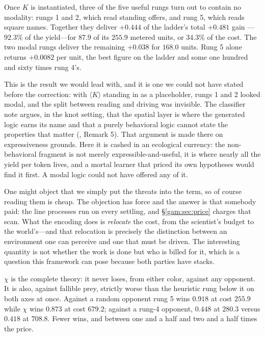 \begin{observation}\label{gam:obs:spatial}
Once $K$ is instantiated, three of the five useful rungs turn out to contain no
modality: rungs 1 and 2, which read standing offers, and rung 5, which reads
square names. Together they deliver $+0.444$ of the ladder's total $+0.481$ gain
---$92.3\%$ of the yield---for $87.9$ of its $255.9$ metered units, or $34.3\%$
of the cost. The two modal rungs deliver the remaining $+0.038$ for $168.0$
units. Rung 5 alone returns $+0.0082$ per unit, the best figure on the ladder
and some one hundred and sixty times rung 4's.
\end{observation}

This is the result we would lead with, and it is one we could not have stated
before the correction: with $\langle K\rangle$ standing in as a placeholder,
rungs 1 and 2 looked modal, and the split between reading and driving was
invisible. The classifier note argues, in the knot setting, that the spatial
layer is where the generated logic earns its name and that a purely behavioral
logic cannot state the properties that matter (\cite{ClassifierNote}, Remark 5).
That argument is made there on expressiveness grounds. Here it is cashed in an
ecological currency: the non-behavioral fragment is not merely
expressible-and-useful, it is where nearly all the yield per token lives, and a
mortal learner that priced its own hypotheses would find it first. A modal logic
could not have offered any of it.

\begin{remark}\label{gam:why-this-artefact-encoding}
One might object that we simply put the threats into the term, so of course
reading them is cheap. The objection has force and the answer is that somebody
paid: the line processes run on every settling, and \S\ref{gam:sec:price} charges
that scan. What the encoding does is \emph{relocate} the cost, from the
scientist's budget to the world's---and that relocation is precisely the
distinction between an environment one can perceive and one that must be driven.
The interesting quantity is not whether the work is done but who is billed for
it, which is a question this framework can pose because both parties have
stacks.
\end{remark}

\begin{observation}\label{gam:obs:chi}
$\chi$ is the complete theory: it never loses, from either color, against any
opponent. It is also, against fallible prey, strictly worse than the heuristic
rung below it on both axes at once. Against a random opponent rung 5 wins
$0.918$ at cost $255.9$ while $\chi$ wins $0.873$ at cost $679.2$; against a
rung-4 opponent, $0.448$ at $280.3$ versus $0.418$ at $708.8$. Fewer wins, and
between one and a half and two and a half times the price.
\end{observation}

